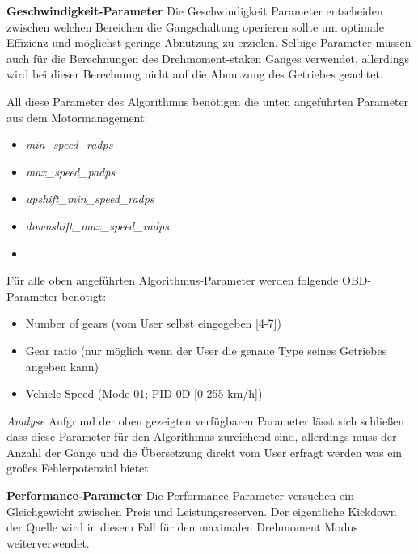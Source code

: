 \textbf{Geschwindigkeit-Parameter}
Die Geschwindigkeit Parameter entscheiden zwischen welchen Bereichen die Gangschaltung operieren sollte um optimale Effizienz und möglichst geringe Abnutzung zu erzielen. Selbige Parameter müssen auch für die Berechnungen des 
Drehmoment-staken Ganges verwendet, allerdings wird bei dieser Berechnung nicht auf die Abnutzung des Getriebes geachtet.

All diese Parameter des Algorithmus benötigen die unten angeführten Parameter aus dem Motormanagement:
\begin{itemize}
	\item \textit{min_speed_radps}
	\cite{The speed below which the transmission must downshift}
	\item \textit{max_speed_padps}
	\cite{The speed above which the transmission must upshift.}
	\item \textit{upshift_min_speed_radps}
	\cite{The minimum speed required in a gear before upshift to that gear is allowed. Provides headroom above the min_speed_radps}
	\item \textit{downshift_max_speed_radps}
	\cite{The maximum speed allowed in a gear at the time of downshifting to that gear. [...] Provides headroom to downshift without hitting the max_speed_radps}
	\item
\end{itemize}
Für alle oben angeführten Algorithmus-Parameter werden folgende OBD-Parameter benötigt:
\begin{itemize}
	\item Number of gears (vom User selbst eingegeben [4-7])
	\item Gear ratio (nur möglich wenn der User die genaue Type seines Getriebes angeben kann)
	\item Vehicle Speed (Mode 01; PID 0D [0-255 km/h])
\end{itemize}

\textit{Analyse}
Aufgrund der oben gezeigten verfügbaren Parameter lässt sich schließen dass diese Parameter für den Algorithmus zureichend sind, allerdings muss der Anzahl der Gänge und die Übersetzung direkt vom User erfragt werden was ein großes Fehlerpotenzial bietet.

\textbf{Performance-Parameter}
Die Performance Parameter versuchen ein Gleichgewicht zwischen Preis und Leistungsreserven. Der eigentliche Kickdown der Quelle wird in diesem Fall für den maximalen Drehmoment Modus weiterverwendet.

